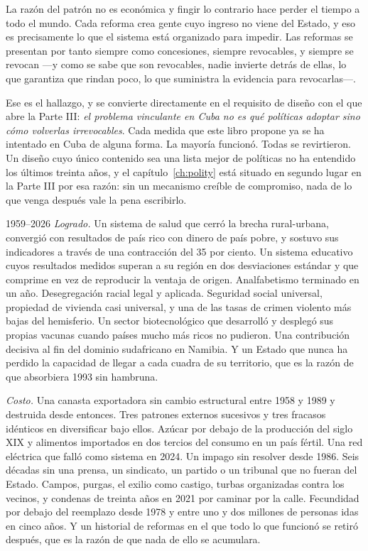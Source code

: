 La razón del patrón no es económica y fingir lo contrario hace perder el tiempo a
todo el mundo. Cada reforma crea gente cuyo ingreso no viene del Estado, y eso es
precisamente lo que el sistema está organizado para impedir. Las reformas se
presentan por tanto siempre como concesiones, siempre revocables, y siempre se
revocan ---y como se sabe que son revocables, nadie invierte detrás de ellas, lo que
garantiza que rindan poco, lo que suministra la evidencia para revocarlas---.

Ese es el hallazgo, y se convierte directamente en el requisito de diseño con el que
abre la Parte III: \emph{el problema vinculante en Cuba no es qué políticas adoptar
sino cómo volverlas irrevocables}. Cada medida que este libro propone ya se ha
intentado en Cuba de alguna forma. La mayoría funcionó. Todas se revirtieron. Un
diseño cuyo único contenido sea una lista mejor de políticas no ha entendido los
últimos treinta años, y el capítulo~\ref{ch:polity} está situado en segundo lugar en
la Parte III por esa razón: sin un mecanismo creíble de compromiso, nada de lo que
venga después vale la pena escribirlo.

\begin{ledger}{1959--2026}
\emph{Logrado.} Un sistema de salud que cerró la brecha rural-urbana, convergió con
resultados de país rico con dinero de país pobre, y sostuvo sus indicadores a través
de una contracción del 35 por ciento. Un sistema educativo cuyos resultados medidos
superan a su región en dos desviaciones estándar y que comprime en vez de reproducir
la ventaja de origen. Analfabetismo terminado en un año. Desegregación racial legal y
aplicada. Seguridad social universal, propiedad de vivienda casi universal, y una de
las tasas de crimen violento más bajas del hemisferio. Un sector biotecnológico que
desarrolló y desplegó sus propias vacunas cuando países mucho más ricos no pudieron.
Una contribución decisiva al fin del dominio sudafricano en Namibia. Y un Estado que
nunca ha perdido la capacidad de llegar a cada cuadra de su territorio, que es la
razón de que absorbiera 1993 sin hambruna.

\emph{Costo.} Una canasta exportadora sin cambio estructural entre 1958 y 1989 y
destruida desde entonces. Tres patrones externos sucesivos y tres fracasos idénticos
en diversificar bajo ellos. Azúcar por debajo de la producción del siglo XIX y
alimentos importados en dos tercios del consumo en un país fértil. Una red eléctrica
que falló como sistema en 2024. Un impago sin resolver desde 1986. Seis décadas sin
una prensa, un sindicato, un partido o un tribunal que no fueran del Estado. Campos,
purgas, el exilio como castigo, turbas organizadas contra los vecinos, y condenas de
treinta años en 2021 por caminar por la calle. Fecundidad por debajo del reemplazo
desde 1978 y entre uno y dos millones de personas idas en cinco años. Y un historial
de reformas en el que todo lo que funcionó se retiró después, que es la razón de que
nada de ello se acumulara.
\end{ledger}
